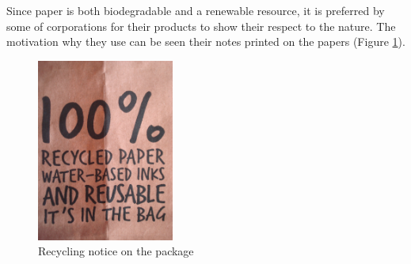 

Since paper is both biodegradable and a renewable resource, it is preferred by some of corporations for their products to show their respect to the nature. The motivation why they use can be seen their notes printed on the papers (Figure \ref{fig:NoteOnPackage}).

\begin{figure}[h!]
  \centering
  \includegraphics[height=6cm]{project_graphics/recycled_note.jpg}
  \caption{Recycling notice on the package}
  \label{fig:NoteOnPackage}
\end{figure}





